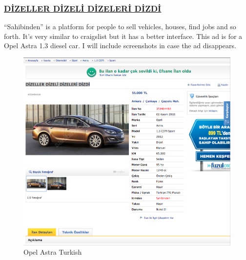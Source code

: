 \documentclass[10pt,letterpaper,bibliography=totoc]{scrartcl}
\begin{document}
\subsubsection{\href{https://www.sahibinden.com/ilan/vasita-otomobil-opel-dizeller-dizeli-dizeleri-dizdi-359464489/detay}{DİZELLER DİZELİ DİZELERİ DİZDİ}}
``Sahibinden'' is a platform for people to sell vehicles, houses, find jobs and so forth. It's very similar to craigslist but it has a better interface. This ad is for a Opel Astra 1.3 diesel car. I will include screenshots in case the ad disappears. 
\begin{figure}[h!]
\centering
\label{fig:car_ad_turkish}
\includegraphics[scale=.5]{opel_turkish.png}
\caption{Opel Astra Turkish}
\end{figure}
\end{document}
